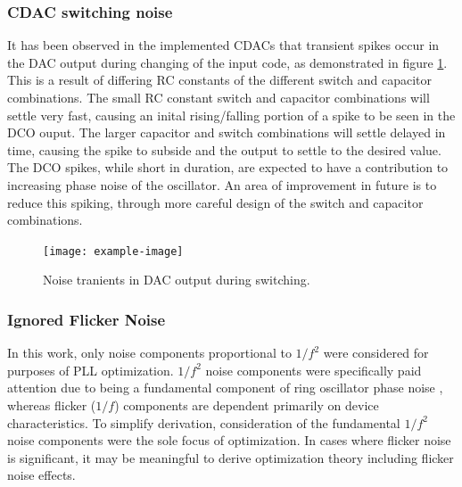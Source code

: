 	\subsubsection{CDAC switching noise}	
		It has been observed in the implemented CDACs that transient spikes occur in the DAC output during changing of the input code, as demonstrated in figure \ref{fig:dac_sw_noise}. This is a result of differing RC constants of the different switch and capacitor combinations.  The small RC constant switch and capacitor combinations will settle very fast, causing an inital rising/falling portion of a spike to be seen in the DCO ouput. The larger capacitor and switch combinations will settle delayed in time, causing the spike to subside and the output to settle to the desired value. The DCO spikes, while short in duration, are expected to have a contribution to increasing phase noise of the oscillator. An area of improvement in future is to reduce this spiking, through more careful design of the switch and capacitor combinations. 
		\begin{figure}[htb!]
	        \centering
	        \texttt{[image: example-image]}
		    \caption{Noise tranients in DAC output during switching.}
		    \label{fig:dac_sw_noise}
		\end{figure}

	\subsubsection{Ignored Flicker Noise}
	In this work, only noise components proportional to $1/f^2$ were considered for purposes of PLL optimization. $1/f^2$ noise components were specifically paid attention due to being a fundamental component of ring oscillator phase noise \cite{Navid2005}, whereas flicker ($1/f$) components are dependent primarily on device characteristics. To simplify derivation, consideration of the fundamental $1/f^2$ noise components were the sole focus of optimization. In cases where flicker noise is significant, it may be meaningful to derive optimization theory including flicker noise effects.

\FloatBarrier

